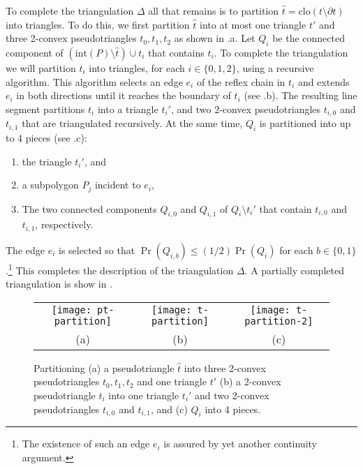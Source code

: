 \documentclass[lotsofwhite]{patmorin}
\newcommand{\boundary}{\partial}
\newcommand{\closure}{\mathrm{clo}}
\newcommand{\interior}{\mathrm{int}}
\newcommand{\z}[1]{{\hat{#1}}}
\begin{document}
To complete the triangulation $\Delta$ all that remains is to
partition $\z t=\closure(t\setminus \boundary t)$ into triangles.  To
do this, we first partition $\z t$ into at most one triangle $t'$ and
three
2-convex pseudotriangles $t_0,t_1,t_2$ as shown in
.a. Let $Q_i$ be the connected component of
$(\interior(P)\setminus \z t)\cup t_i$ that contains $t_i$.  To
complete the triangulation we will partition $t_i$ into triangles, for
each $i\in\{0,1,2\}$, using a recursive algorithm.  This algorithm
selects an edge $e_i$ of the reflex chain in $t_i$ and extends $e_i$
in both directions until it reaches the boundary of $t_i$ (see
.b).  The resulting line segment partitions $t_i$
into a triangle $t_i'$, and two 2-convex pseudotriangles $t_{i,0}$ and
$t_{i,1}$ that are triangulated recursively.  At the same time, $Q_i$
is partitioned into up to 4 pieces (see .c):

\begin{enumerate}
\item the triangle $t_i'$, and
\item a subpolygon $P_j$ incident to $e_i$,
\item The two connected components $Q_{i,0}$
and $Q_{i,1}$ of $Q_i\setminus t_i'$ that contain $t_{i,0}$ and
$t_{i,1}$, respectively.
\end{enumerate}
The edge $e_i$ is selected
so that $\Pr(Q_{i,b})\le (1/2)\Pr(Q_i)$ for each
$b\in\{0,1\}$.\footnote{The existence of such an edge $e_i$ is assured
by yet another continuity argument.}  This
completes the description of the triangulation $\Delta$.  A partially
completed triangulation is show in .

\begin{figure}
  \begin{center}
    \begin{tabular}{ccc}
      \texttt{[image: pt-partition]} & 
      \texttt{[image: t-partition]} &
      \texttt{[image: t-partition-2]} \\
      (a) & (b) & (c)
    \end{tabular}
  \end{center}
  \caption{Partitioning (a) a pseudotriangle $\z t$ into three 2-convex
pseudotriangles $t_0,t_1,t_2$ and one triangle $t'$ (b) a 2-convex
pseudotriangle $t_i$ into one triangle $t_i'$ and two 2-convex
pseudotriangles $t_{i,0}$ and $t_{i,1}$, and (c) $Q_i$ into 4 pieces.}
\end{figure}
\end{document}
